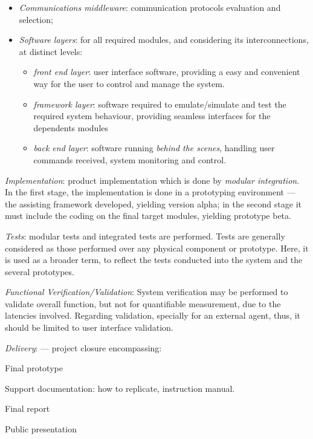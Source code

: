 \begin{item-c}
\begin{itemize}
\begin{itemize}
  respective circuitry design and simulation;
\item \emph{Communications middleware}: communication protocols evaluation and
  selection;
\item \emph{Software layers}: for all required modules, and considering its
  interconnections, at distinct levels:
  \begin{itemize}
  \item \emph{front end layer}: user interface software, providing a easy and convenient
    way for the user to control and manage the system.
  \item \emph{framework layer}: software required to emulate/simulate and test the
    required system behaviour, providing seamless interfaces for the dependents
    modules
  \item \emph{back end layer}: software running \emph{behind the scenes}, handling user
    commands received, system monitoring and control.
  \end{itemize}
\end{itemize}
\end{itemize}
\item \emph{Implementation}: product implementation which is done by
  \emph{modular integration}. In the first stage, the implementation is done in a prototyping
environment --- the assisting framework developed, yielding version alpha; in the second stage
it must include the coding on the final target modules, yielding
prototype beta.
\item \emph{Tests}: modular tests and integrated tests are performed. Tests are generally considered as those performed over any physical
component or prototype. Here, it is used as a broader term, to reflect the tests
conducted into the system and the several prototypes.
\item \emph{Functional Verification/Validation}: System verification may be performed to validate overall
  function, but not for quantifiable measurement, due to the latencies
  involved. Regarding validation, specially for an external agent, thus, it should be limited
  to user interface validation.
\item \emph{Delivery}: --- project closure encompassing:
\begin{enum-c}
\item Final prototype
\item Support documentation: how to replicate, instruction manual.
\item Final report
\item Public presentation
\end{enum-c}
\end{item-c}

